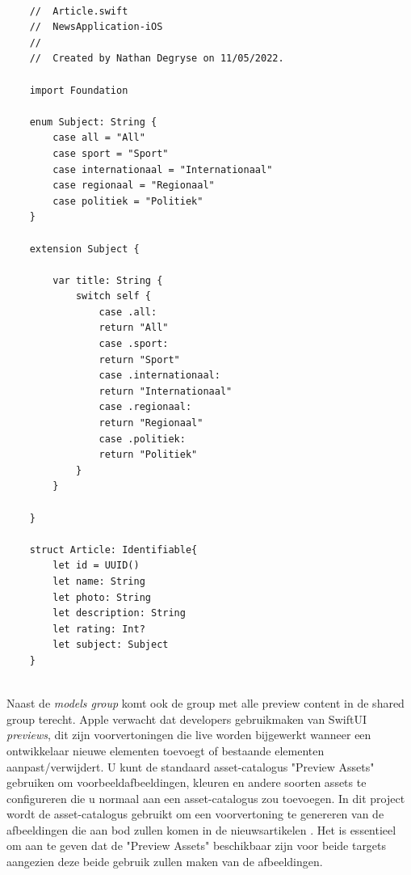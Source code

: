 \newpage
\begin{lstlisting}
    
    //  Article.swift
    //  NewsApplication-iOS
    //
    //  Created by Nathan Degryse on 11/05/2022.
    
    import Foundation
    
    enum Subject: String {
        case all = "All"
        case sport = "Sport"
        case internationaal = "Internationaal"
        case regionaal = "Regionaal"
        case politiek = "Politiek"
    }
    
    extension Subject {
        
        var title: String {
            switch self {
                case .all:
                return "All"
                case .sport:
                return "Sport"
                case .internationaal:
                return "Internationaal"
                case .regionaal:
                return "Regionaal"
                case .politiek:
                return "Politiek"
            }
        }
        
    }
    
    struct Article: Identifiable{
        let id = UUID()
        let name: String
        let photo: String
        let description: String
        let rating: Int?
        let subject: Subject
    }
    
\end{lstlisting}
\newpage

Naast de \textit{models group} komt ook de group met alle preview content in de shared group terecht. Apple verwacht dat developers gebruikmaken van SwiftUI \textit{previews}, dit zijn voorvertoningen die live worden bijgewerkt wanneer een ontwikkelaar nieuwe elementen toevoegt of bestaande elementen aanpast/verwijdert. U kunt de standaard asset-catalogus "Preview Assets" gebruiken om voorbeeldafbeeldingen, kleuren en andere soorten assets te configureren die u normaal aan een asset-catalogus zou toevoegen. In dit project wordt de asset-catalogus gebruikt om een voorvertoning te genereren van de afbeeldingen die aan bod zullen komen in de nieuwsartikelen \autocite{VanDerLee2021}. Het is essentieel om aan te geven dat de "Preview Assets" beschikbaar zijn voor beide targets aangezien deze beide gebruik zullen maken van de afbeeldingen.

